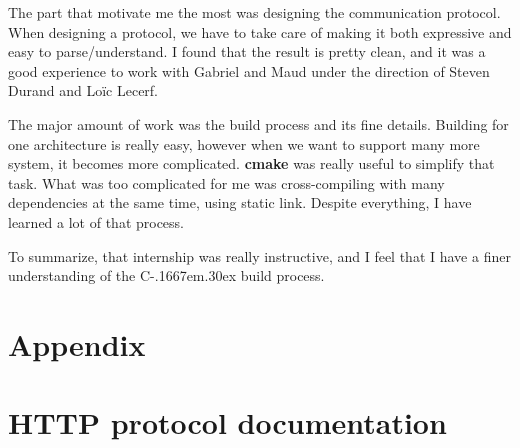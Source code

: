 \documentclass[a4paper,11pt]{custom}
\newcommand{\cmake}{\textbf{cmake}\xspace}
\newcommand{\cpp}{%
  C\kern-.1667em\raise.30ex\hbox{\smaller{++}}%
  \spacefactor1000\xspace%
}
\begin{document}
The part that motivate me the most was designing the communication protocol.
When designing a protocol, we have to take care of making it both expressive and
easy to parse/understand. I found that the result is pretty clean, and it was a
good experience to work with Gabriel and Maud under the direction of Steven
Durand and Loïc Lecerf.

The major amount of work was the build process and its fine details. Building
for one architecture is really easy, however when we want to support many more
system, it becomes more complicated. \cmake{} was really useful to simplify that
task. What was too complicated for me was cross-compiling with many dependencies
at the same time, using static link. Despite everything, I have learned a lot of
that process.

To summarize, that internship was really instructive, and I feel that I have a
finer understanding of the \cpp{} build process.

\appendix

\chapter*{Appendix}

\chapter{HTTP protocol documentation}
\label{sec:documentation}

\end{document}
